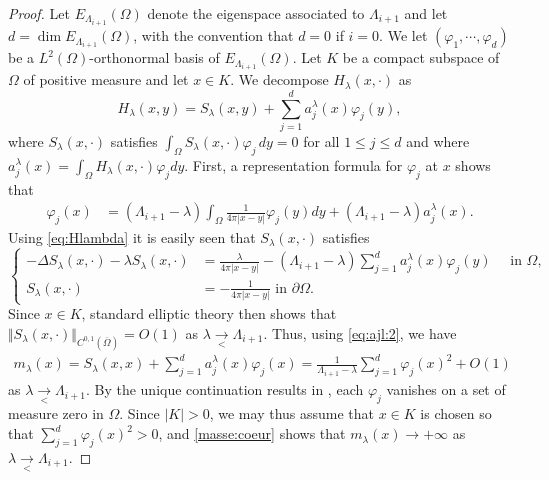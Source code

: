 \documentclass[10pt]{amsart}
\numberwithin{equation}{section}
\newcommand{\vp}{\varphi}
\newcommand{\Om}{\Omega}
\theoremstyle{plain}
\theoremstyle{remark}
\begin{document}
\begin{proof}
Let $E_{\Lambda_{i+1}}(\Om)$ denote the eigenspace associated to $\Lambda_{i+1}$ and let $d = \dim E_{\Lambda_{i+1}}(\Om)$, with the convention that $d=0$ if $i=0$. We let $(\vp_1, \cdots, \vp_d)$ be a $L^2(\Om)$-orthonormal basis of $E_{\Lambda_{i+1}}(\Om)$. Let $K$ be a compact subspace of $\Om$ of positive measure and let $x \in K$. We decompose $H_\lambda(x, \cdot)$ as 
$$ H_{\lambda}(x, y) = S_\lambda(x,y) + \sum_{j=1}^d a_j^{\lambda}(x) \vp_j(y), $$
where $S_\lambda(x,\cdot)$ satisfies $\int_{\Om} S_\lambda(x,\cdot) \vp_j \, dy = 0$ for all $1 \le j \le d$ and where $a_j^{\lambda}(x) = \int_{\Om} H_\lambda(x, \cdot) \vp_j dy$. First, a representation formula for $\vp_j$ at $x$ shows that 
\begin{equation} \label{eq:ajl:2}
 \begin{aligned}
\vp_j(x) & =  (\Lambda_{i+1} - \lambda)  \int_{\Om}  \frac{1}{4\pi |x-y|} \vp_j(y) dy +  (\Lambda_{i+1} - \lambda) a_j^{\lambda}(x).
\end{aligned} 
\end{equation}
Using \eqref{eq:Hlambda} it is easily seen that $S_\lambda(x, \cdot)$ satisfies 
\begin{equation*} 
\left \{\begin{aligned}
- \Delta S_\lambda(x, \cdot) - \lambda S_\lambda(x, \cdot) &=  \frac{\lambda}{4\pi |x-y|} - (\Lambda_{i+1} - \lambda) \sum_{j=1}^d a_j^{\lambda}(x) \vp_j(y)  \quad \text{ in } \Om, \\
  S_\lambda(x, \cdot) & = - \frac{1}{4\pi |x-y|} \text{ in } \partial \Om.
\end{aligned} \right.
\end{equation*}
Since $x \in K$, standard elliptic theory then shows that $\Vert S_\lambda(x, \cdot) \Vert_{C^{0,1}(\overline{\Om})} = O(1)$ as $\lambda \underset{< }{\to} \Lambda_{i+1}$. Thus, using \eqref{eq:ajl:2}, we have
\begin{equation} \label{masse:coeur}
\begin{aligned}
 m_\lambda(x)  = S_\lambda(x,x)  +  \sum_{j=1}^d a_j^{\lambda}(x) \vp_j(x) 
  =  \frac{1}{\Lambda_{i+1} - \lambda}  \sum_{j=1}^d \vp_j(x)^2 + O(1) 
  \end{aligned} 
  \end{equation} 
  as $\lambda \underset{< }{\to} \Lambda_{i+1}$. By the unique continuation results in \cite{HardtSimon}, each $\vp_j$ vanishes on a set of measure zero in $\Om$. Since $|K| >0$, we may thus assume that $x \in K$ is chosen so that $ \sum_{j=1}^d \vp_j(x)^2 >0$, and \eqref{masse:coeur} shows that $m_\lambda(x) \to + \infty$ as $\lambda \underset{< }{\to} \Lambda_{i+1}$. 
  \end{proof}
\end{document}
